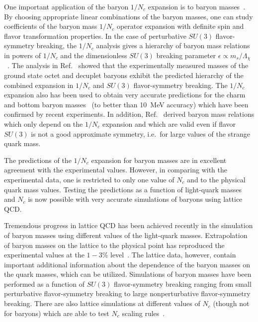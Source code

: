 \documentclass[twocolumn,nofootinbib,prd,aps,superscriptaddress,tightenlines]{revtex4}
\begin{document}
One important application of the baryon $1/N_c$ expansion is to baryon masses~\cite{djm1,jl,h}.  By choosing appropriate linear combinations of the baryon masses, one can study coefficients of the baryon mass $1/N_c$ operator expansion with definite spin and flavor transformation properties. In the case of perturbative $SU(3)$ flavor-symmetry breaking, the $1/N_c$ analysis gives a hierarchy of baryon mass relations in powers of $1/N_c$ and the dimensionless $SU(3)$ breaking parameter $\epsilon \propto m_s/ \Lambda_\chi$~\cite{jl}.  The analysis in Ref.~\cite{jl} showed that the experimentally measured masses of the ground state octet and decuplet baryons exhibit the predicted hierarchy of the combined expansion in $1/N_c$ and $SU(3)$ flavor-symmetry breaking. The $1/N_c$ expansion also has been used to obtain very accurate predictions for the charm and bottom baryon masses~\cite{h} (to better than 10~MeV accuracy) which have been confirmed by recent experiments.  In addition, Ref.~\cite{djm1} derived baryon mass relations which only depend on the $1/N_c$ expansion and which are valid even if flavor $SU(3)$ is not a good approximate symmetry, i.e.\ for large values of the strange quark mass.


The predictions of the $1/N_c$ expansion for baryon masses are in excellent agreement with the experimental values. However, in comparing with the experimental data, one is restricted to only one value of $N_c$ and to the physical quark mass values.  Testing the predictions as a function of light-quark masses and $N_c$ is now possible with very accurate simulations of baryons using lattice QCD.

Tremendous progress in lattice QCD has been achieved recently in the simulation of baryon masses using different values of the light-quark masses.  Extrapolation of baryon masses on the lattice to the physical point has reproduced the experimental values at the $1-3\%$ level~\cite{Durr:2009ma}.  The lattice data, however, contain important additional information about the dependence of the baryon masses on the quark masses, which can be utilized.  Simulations of baryon masses have been performed as a function of $SU(3)$ flavor-symmetry breaking ranging from small perturbative flavor-symmetry breaking to large nonperturbative flavor-symmetry breaking.  There are also lattice simulations at different values of $N_c$ (though not for baryons) which are able to test  $N_c$ scaling rules~\cite{Teper:1998te,teper}.
\end{document}
